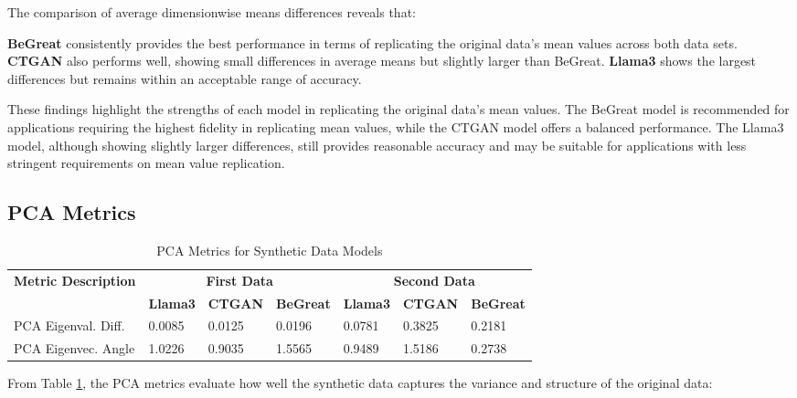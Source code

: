 \vspace{0.5cm}


The comparison of average dimensionwise means differences reveals that:

\textbf{BeGreat} consistently provides the best performance in terms of replicating the original data's mean values across both data sets.
\textbf{CTGAN} also performs well, showing small differences in average means but slightly larger than BeGreat.
\textbf{Llama3} shows the largest differences but remains within an acceptable range of accuracy.


\vspace{0.5cm}

These findings highlight the strengths of each model in replicating the original data's mean values. The BeGreat model is recommended for applications requiring the highest fidelity in replicating mean values, while the CTGAN model offers a balanced performance. The Llama3 model, although showing slightly larger differences, still provides reasonable accuracy and may be suitable for applications with less stringent requirements on mean value replication.




\subsection{PCA Metrics}

\begin{table}[H]
\centering
\caption{PCA Metrics for Synthetic Data Models}
\label{tab:pca_metrics_combined}
\begin{tabularx}{\textwidth}{l*{6}{X}}
    \toprule
    \textbf{Metric Description} & \multicolumn{3}{c}{\textbf{First Data}} & \multicolumn{3}{c}{\textbf{Second Data}} \\
    \cmidrule(lr){2-4} \cmidrule(lr){5-7}
    & \textbf{Llama3} & \textbf{CTGAN} & \textbf{BeGreat} & \textbf{Llama3} & \textbf{CTGAN} & \textbf{BeGreat} \\
    \midrule
    PCA Eigenval. Diff. & 0.0085 & 0.0125 & 0.0196 & 0.0781 & 0.3825 & 0.2181 \\
    PCA Eigenvec. Angle & 1.0226 & 0.9035 & 1.5565 & 0.9489 & 1.5186 & 0.2738 \\
    \bottomrule
\end{tabularx}
\end{table}


From Table \ref{tab:pca_metrics_combined}, the PCA metrics evaluate how well the synthetic data captures the variance and structure of the original data:

